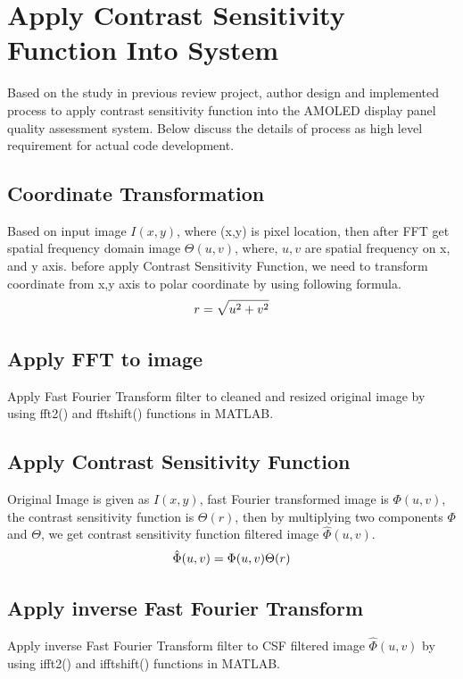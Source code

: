 \documentclass{article}
\begin{document}
\section{Apply Contrast Sensitivity Function Into System}
Based on the study in previous review project, author design and implemented process to apply contrast sensitivity function into the AMOLED display panel quality assessment system. Below discuss the details of process as high level requirement for actual code development.
\subsection{Coordinate Transformation}
Based on input image $I(x,y)$, where (x,y) is pixel location, then after FFT get spatial frequency domain image $\Theta(u,v)$, where, $u,v$ are spatial frequency on x, and y axis. before apply Contrast Sensitivity Function, we need to transform coordinate from x,y axis to polar coordinate by using following formula.
\begin{equation}
    \centering
    \label{eq:coor}
     r = \sqrt{u^2+v^2}
\end{equation}

\subsection{Apply FFT to image}
Apply Fast Fourier Transform filter to cleaned and resized original image by using fft2() and fftshift() functions in MATLAB.

\subsection{Apply Contrast Sensitivity Function}
Original Image is given as $I(x,y)$, fast Fourier transformed image is $\Phi(u,v)$, the contrast sensitivity function is $\Theta(r)$, then by multiplying two components $\Phi$ and $\Theta$, we get contrast sensitivity function filtered image $\hat{\Phi}(u,v)$.
\begin{equation}
    \centering
    \label{eq:applyCSF}
    \hat{\Phi}(u,v) = \Phi(u,v)\Theta(r) 
\end{equation}
\subsection{Apply inverse Fast Fourier Transform}
Apply inverse Fast Fourier Transform filter to CSF filtered image $\hat{\Phi}(u,v)$ by using ifft2() and ifftshift() functions in MATLAB.
\end{document}
